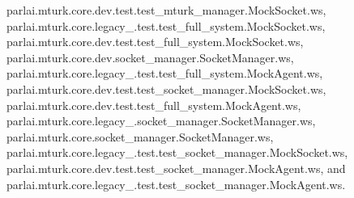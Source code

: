 parlai.\+mturk.\+core.\+dev.\+test.\+test\+\_\+mturk\+\_\+manager.\+Mock\+Socket.\+ws, parlai.\+mturk.\+core.\+legacy\+\_.\+test.\+test\+\_\+full\+\_\+system.\+Mock\+Socket.\+ws, parlai.\+mturk.\+core.\+dev.\+test.\+test\+\_\+full\+\_\+system.\+Mock\+Socket.\+ws, parlai.\+mturk.\+core.\+dev.\+socket\+\_\+manager.\+Socket\+Manager.\+ws, parlai.\+mturk.\+core.\+legacy\+\_.\+test.\+test\+\_\+full\+\_\+system.\+Mock\+Agent.\+ws, parlai.\+mturk.\+core.\+dev.\+test.\+test\+\_\+socket\+\_\+manager.\+Mock\+Socket.\+ws, parlai.\+mturk.\+core.\+dev.\+test.\+test\+\_\+full\+\_\+system.\+Mock\+Agent.\+ws, parlai.\+mturk.\+core.\+legacy\+\_.\+socket\+\_\+manager.\+Socket\+Manager.\+ws, parlai.\+mturk.\+core.\+socket\+\_\+manager.\+Socket\+Manager.\+ws, parlai.\+mturk.\+core.\+legacy\+\_.\+test.\+test\+\_\+socket\+\_\+manager.\+Mock\+Socket.\+ws, parlai.\+mturk.\+core.\+dev.\+test.\+test\+\_\+socket\+\_\+manager.\+Mock\+Agent.\+ws, and parlai.\+mturk.\+core.\+legacy\+\_.\+test.\+test\+\_\+socket\+\_\+manager.\+Mock\+Agent.\+ws.

